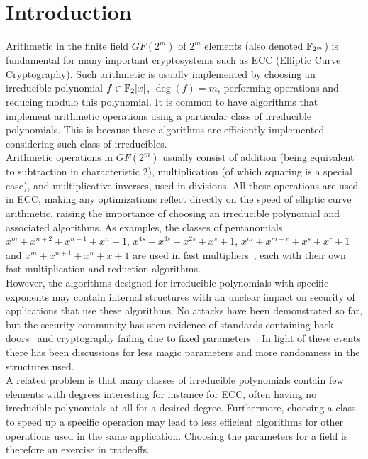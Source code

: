 \section{Introduction}

Arithmetic in the finite field $GF(2^m)$ of $2^m$ elements (also denoted $\mathbb{F}_{2^m}$) is fundamental for many important cryptosystems such as ECC (Elliptic Curve Cryptography). Such arithmetic is usually implemented by choosing an irreducible polynomial $f \in \mathbb{F}_2[x]$, $\deg(f) = m$, performing operations and reducing modulo this polynomial. It is common to have algorithms that implement arithmetic operations using a particular class of irreducible polynomials. This is because these algorithms are efficiently implemented considering such class of irreducibles.\\

Arithmetic operations in $GF(2^m)$ usually consist of addition (being equivalent to subtraction in characteristic 2), multiplication (of which squaring is a special case), and multiplicative inverses, used in divisions. All these operations are used in ECC, making any optimizations reflect directly on the speed of elliptic curve arithmetic, raising the importance of choosing an irreducible polynomial and associated algorithms. As examples, the classes of pentanomials $x^m+x^{n+2}+x^{n+1}+x^{n}+1$, $x^{4s}+x^{3s}+x^{2s}+x^s+1$, $x^m+x^{m-r}+x^s+x^r+1$ and $x^m+x^{n+1}+x^n+x+1$ are used in fast multipliers~\cite{fan2015survey}, each with their own fast multiplication and reduction algorithms.\\

However, the algorithms designed for irreducible polynomials with specific exponents may contain internal structures with an unclear impact on security of applications that use these algorithms. No attacks have been demonstrated so far, but the security community has seen evidence of standards containing back doors~\cite{bernstein2016dual} and cryptography failing due to fixed parameters~\cite{adrian2015imperfect}. In light of these events there has been discussions for less magic parameters and more randomness in the structures used.\\

A related problem is that many classes of irreducible polynomials contain few elements with degrees interesting for instance for ECC, often having no irreducible polynomials at all for a desired degree. Furthermore, choosing a class to speed up a specific operation may lead to less efficient algorithms for other operations used in the same application. Choosing the parameters for a field is therefore an exercise in tradeoffs. \\

